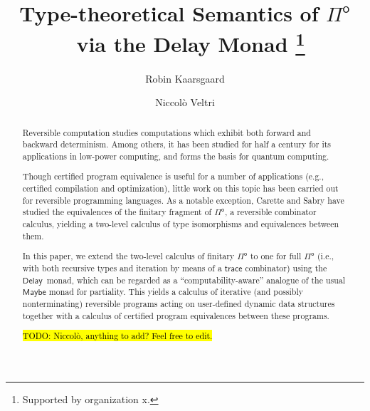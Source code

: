 \documentclass[runningheads,a4paper]{llncs}
\newcommand{\Pio}{\ensuremath{\mathsf{\Pi}^{\mathsf{o}}}}
\newcommand{\trace}{\ensuremath{\mathsf{trace}}}
\newcommand{\Delay}{\ensuremath{\mathsf{Delay}\,}}
\newcommand{\todo}[1]{\hl{TODO: #1}}
\begin{document}
%
\title{Type-theoretical Semantics of \Pio\ via the Delay Monad \thanks{Supported by organization x.}}
%
%
\author{Robin Kaarsgaard  \and
Niccol\`o Veltri}
%
%
%
\maketitle              %
%
\begin{abstract}
Reversible computation studies computations which exhibit both forward and
backward determinism. Among others, it has been studied for half a century for
its applications in low-power computing, and forms the basis for quantum
computing. 

Though certified program equivalence is useful for a number of applications
(e.g., certified compilation and optimization), little work on this topic has
been carried out for reversible programming languages. As a notable exception,
Carette and Sabry have studied the equivalences of the finitary fragment of \Pio, a reversible combinator calculus, yielding a two-level calculus of type isomorphisms and equivalences between them.

In this paper, we extend the two-level calculus of finitary \Pio{} to one for
full \Pio{} (i.e., with both recursive types and iteration by means of a
\trace{} combinator) using the \Delay{} monad, which can be regarded as a
``computability-aware'' analogue of the usual $\mathsf{Maybe}$ monad for
partiality. This yields a calculus of iterative (and possibly nonterminating)
reversible programs acting on user-defined dynamic data structures together
with a calculus of certified program equivalences between these programs.

\todo{Niccol\`o, anything to add? Feel free to edit.}

\end{abstract}
\end{document}
